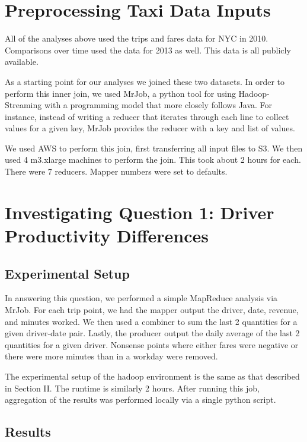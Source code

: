 \documentclass[twoside]{article}
\begin{document}
\begin{multicols}{2}

\section{Preprocessing Taxi Data Inputs}

All of the analyses above used the trips and fares data for NYC in 2010. Comparisons over time used the data for 2013 as well. This data is all publicly available. 

As a starting point for our analyses we joined these two datasets. In order to perform this inner join, we used MrJob, a python tool for using Hadoop-Streaming with a programming model that more closely follows Java. For instance, instead of writing a reducer that iterates through each line to collect values for a given key, MrJob provides the reducer with a key and list of values. 

We used AWS to perform this join, first transferring all input files to S3. We then used 4 m3.xlarge machines to perform the join. This took about 2 hours for each. There were 7 reducers. Mapper numbers were set to defaults. 
\section{Investigating Question 1: Driver Productivity Differences}

\subsection{Experimental Setup}
In answering this question, we performed a simple MapReduce analysis via MrJob. For each trip point, we had the mapper output the driver, date, revenue, and minutes worked. We then used a combiner to sum the last 2 quantities for a given driver-date pair.  Lastly, the producer output the daily average of the last 2 quantities for a given driver. Nonsense points where either fares were negative or there were more minutes than in a workday were removed. 

The experimental setup of the hadoop environment is the same as that described in Section II. The runtime is similarly 2 hours. After running this job, aggregation of the results was performed locally via a single python script.

\subsection{Results}


\end{multicols}
\end{document}
